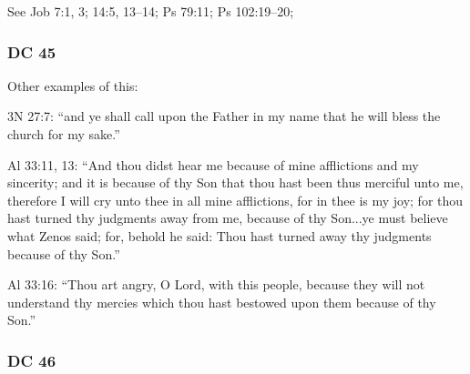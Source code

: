 		\begin{compactdesc}
		
		\item[48$\vert$]
		\begin{compactdesc}
		\item[appointed unto death] See Job 7:1, 3; 14:5, 13--14; Ps 79:11; Ps 102:19--20; %
		
		\end{compactdesc}
		
		\end{compactdesc}

	\subsubsection{DC 45} %
	
		\begin{compactdesc}
		
		\item[3--5$\vert$]
		\begin{compactdesc}
		\item[Father responds because of Christ] Other examples of this:
			\begin{compactitem}
			\item 3N 27:7: ``and ye shall call upon the Father in my name that he will bless the church for my sake.''
			\item Al 33:11, 13: ``And thou didst hear me because of mine afflictions and my sincerity; and it is because of thy Son that thou hast been thus merciful unto me, therefore I will cry unto thee in all mine afflictions, for in thee is my joy; for thou hast turned thy judgments away from me, because of thy Son...ye must believe what Zenos said; for, behold he said: Thou hast turned away thy judgments because of thy Son.''
			\item Al 33:16: ``Thou art angry, O Lord, with this people, because they will not understand thy mercies which thou hast bestowed upon them because of thy Son.''
			\end{compactitem}
		\end{compactdesc}
		
		\end{compactdesc}

	\subsubsection{DC 46} %
	
